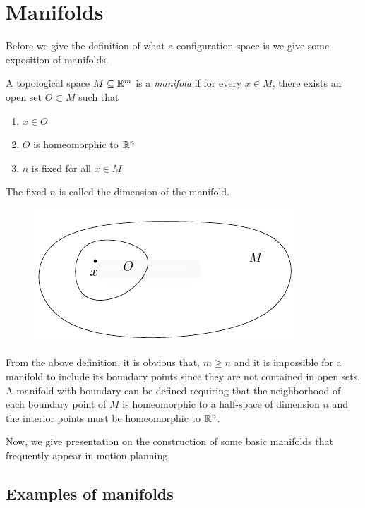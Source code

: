\section{Manifolds}
Before we give the definition of what a configuration space is we give some exposition of manifolds.
\begin{defn}
    A topological space $M \subseteq \mathbb{R}^m$ is a \textit{manifold} if for every $x \in M$, there exists an open set $O \subset M$ such that
    \begin{enumerate}
        \item $x \in O$
        \item $O$ is homeomorphic to $\mathbb{R}^n$
        \item $n$ is fixed for all $x \in M$
    \end{enumerate}
    The fixed $n$ is called the dimension of the manifold.
    \begin{figure}[H]
        \centering
        \includegraphics[scale=.95]{images/manifold}
    \end{figure}
\end{defn}

From the above definition, it is obvious that, $m \ge n$ and it is impossible for a manifold to include its boundary points since they are not contained in open sets.
\linebreak
A manifold with boundary can be defined requiring that the neighborhood of each boundary point of $M$ is homeomorphic to a half-space of dimension $n$ and the interior points must be homeomorphic to $\mathbb{R}^n$.

Now, we give presentation on the construction of some basic manifolds that frequently appear in motion planning.

\subsection{Examples of manifolds}


